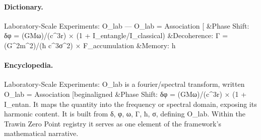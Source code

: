 \paragraph{Dictionary.}
Laboratory-Scale Experiments: O\_lab — O\_lab = Association [ \&Phase Shift: δφ = (GMω)/(c\textasciicircum{}3r) × (1 + I\_entangle/I\_classical) \&Decoherence: Γ = (G\textasciicircum{}2m\textasciicircum{}2)/(ħ c\textasciicircum{}3σ\textasciicircum{}2) × F\_accumulation \&Memory: h

\paragraph{Encyclopedia.}
Laboratory-Scale Experiments: O\_lab is a fourier/spectral transform, written O\_lab = Association [beginaligned \&Phase Shift: δφ = (GMω)/(c\textasciicircum{}3r) × (1 + I\_entan. It maps the quantity into the frequency or spectral domain, exposing its harmonic content. It is built from δ, φ, ω, Γ, ħ, σ, defining O\_lab. Within the Trawin Zero Point registry it serves as one element of the framework's mathematical narrative.
